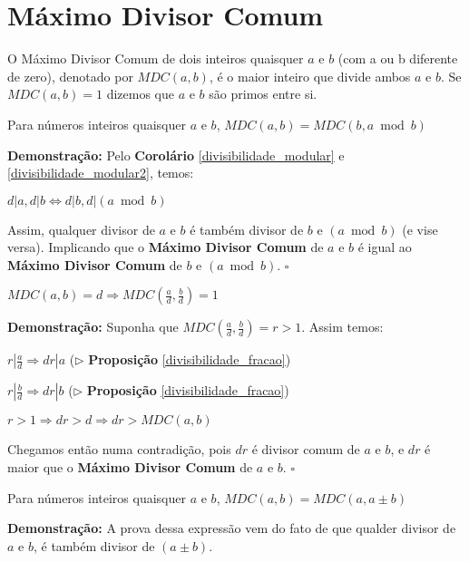 \section{Máximo Divisor Comum}

\begin{definition}
O Máximo Divisor Comum de dois inteiros quaisquer $a$ e $b$ (com a ou b diferente de zero), denotado por $MDC(a,b)$, é o maior inteiro que divide ambos $a$ e $b$. 
Se $MDC(a,b) = 1$ dizemos que $a$ e $b$ são primos entre si.
\end{definition}


\begin{corollary}\label{gcd_modular}
Para números inteiros quaisquer $a$ e $b$, $MDC(a,b) = MDC(b, a \bmod b)$
\end{corollary}
\textbf{Demonstração:}
Pelo \textbf{Corolário} \autoref{divisibilidade_modular} e \autoref{divisibilidade_modular2}, temos:

$d|a, d|b \Leftrightarrow d|b, d|(a \bmod b)$

Assim, qualquer divisor de $a$ e $b$ é também divisor de $b$ e $(a \bmod b)$ (e vise versa). Implicando que o \textbf{Máximo Divisor Comum} de $a$ e $b$
é igual ao \textbf{Máximo Divisor Comum} de $b$ e $(a \bmod b)$. $\square$



\begin{corollary}\label{divisibilidade_mdc}
$MDC(a,b) = d \Rightarrow MDC(\frac{a}{d}, \frac{b}{d}) = 1$
\end{corollary}
\textbf{Demonstração:}
Suponha que $MDC(\frac{a}{d}, \frac{b}{d}) = r > 1$. Assim temos:

$r|\frac{a}{d} \Rightarrow dr|a$ ($\triangleright$ \textbf{Proposição} \autoref{divisibilidade_fracao})

$r|\frac{b}{d} \Rightarrow dr|b$ ($\triangleright$ \textbf{Proposição} \autoref{divisibilidade_fracao})

$r > 1 \Rightarrow dr > d \Rightarrow dr > MDC(a,b)$

Chegamos então numa contradição, pois $dr$ é divisor comum de $a$ e $b$, e $dr$ é maior que o \textbf{Máximo Divisor Comum} de $a$ e $b$. $\square$



\begin{corollary}\label{corolario_gcd_soma}
Para números inteiros quaisquer $a$ e $b$, $MDC(a,b) = MDC(a,a \pm b)$
\end{corollary}
\textbf{Demonstração:}
A prova dessa expressão vem do fato de que qualder divisor de $a$ e $b$, é também divisor de $(a \pm b)$.




